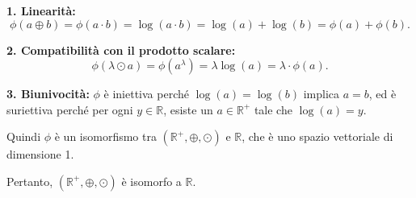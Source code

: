	\textbf{1. Linearità:}
	\[
	\phi(a \oplus b) = \phi(a \cdot b) = \log(a \cdot b) = \log(a) + \log(b) = \phi(a) + \phi(b).
	\]
	
	\textbf{2. Compatibilità con il prodotto scalare:}
	\[
	\phi(\lambda \odot a) = \phi(a^\lambda) = \lambda \log(a) = \lambda \cdot \phi(a).
	\]

	\textbf{3. Biunivocità:}
	\(\phi\) è iniettiva perché \(\log(a) = \log(b)\) implica \(a = b\), ed è suriettiva perché per ogni \(y \in \mathbb{R}\), esiste un \(a \in \mathbb{R}^+\) tale che \(\log(a) = y\).
	
	Quindi \(\phi\) è un isomorfismo tra \((\mathbb{R}^+, \oplus, \odot)\) e \(\mathbb{R}\), che è uno spazio vettoriale di dimensione 1.
	
	Pertanto, \((\mathbb{R}^+, \oplus, \odot)\) è isomorfo a \(\mathbb{R}\).
